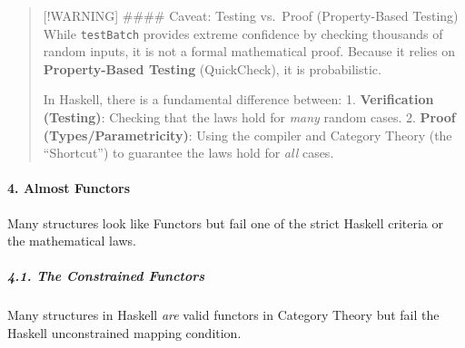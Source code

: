 \documentclass[
]{article}
\begin{document}
\begin{quote}
{[}!WARNING{]} \#\#\#\# Caveat: Testing vs.~Proof (Property-Based
Testing) While \texttt{testBatch} provides extreme confidence by
checking thousands of random inputs, it is not a formal mathematical
proof. Because it relies on \textbf{Property-Based Testing}
(QuickCheck), it is probabilistic.

In Haskell, there is a fundamental difference between: 1.
\textbf{Verification (Testing)}: Checking that the laws hold for
\emph{many} random cases. 2. \textbf{Proof (Types/Parametricity)}: Using
the compiler and Category Theory (the ``Shortcut'') to guarantee the
laws hold for \emph{all} cases.
\end{quote}

\paragraph{4. Almost Functors}\label{almost-functors}

Many structures look like Functors but fail one of the strict Haskell
criteria or the mathematical laws.

\subparagraph{4.1. The Constrained
Functors}\label{the-constrained-functors}

Many structures in Haskell \emph{are} valid functors in Category Theory
but fail the Haskell unconstrained mapping condition.
\end{document}
